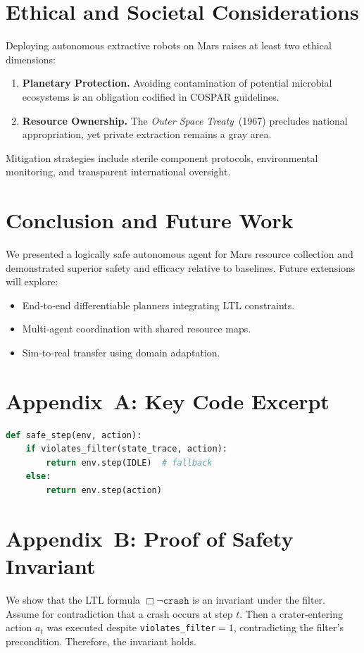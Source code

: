 \documentclass[12pt]{article}
\begin{document}
\section{Ethical and Societal Considerations}\label{sec-ethics}
Deploying autonomous extractive robots on Mars raises at least two ethical dimensions:

\begin{enumerate}
    \item \textbf{Planetary Protection.} Avoiding contamination of potential microbial ecosystems is an obligation codified in COSPAR guidelines.
    \item \textbf{Resource Ownership.} The \emph{Outer Space Treaty} (1967) precludes national appropriation, yet private extraction remains a gray area.
\end{enumerate}

Mitigation strategies include sterile component protocols, environmental monitoring, and transparent international oversight.

\section{Conclusion and Future Work}\label{sec-conclusion}
We presented a logically safe autonomous agent for Mars resource collection and demonstrated superior safety and efficacy relative to baselines.
Future extensions will explore:
\begin{itemize}
    \item End‑to‑end differentiable planners integrating LTL constraints.
    \item Multi‑agent coordination with shared resource maps.
    \item Sim‑to‑real transfer using domain adaptation.
\end{itemize}

\appendix
\section{Appendix A: Key Code Excerpt}
\begin{lstlisting}[language=Python, caption=Safety Filter Implementation, label={lst:safety}]
def safe_step(env, action):
    if violates_filter(state_trace, action):
        return env.step(IDLE)  # fallback
    else:
        return env.step(action)
\end{lstlisting}

\section{Appendix B: Proof of Safety Invariant}
We show that the LTL formula $\Box\neg\texttt{crash}$ is an invariant under the filter.
Assume for contradiction that a crash occurs at step $t$.
Then a crater‑entering action $a_t$ was executed despite \texttt{violates\_filter}$=1$, contradicting the filter's precondition.
Therefore, the invariant holds.
\end{document}
